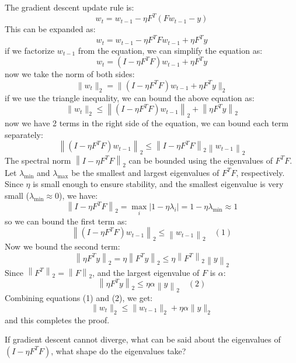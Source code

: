 \begin{qsolve}
	\begin{qsolve}[]
		The gradient descent update rule is:
		$$
		w_t = w_{t-1} - \eta F^T (F w_{t-1} - y)
		$$
		This can be expanded as:
		$$
		w_t = w_{t-1} - \eta F^T F w_{t-1} + \eta F^T y
		$$
		if we factorize \( w_{t-1} \) from the equation, we can simplify the equation as:
		$$
		w_t = (I - \eta F^T F) w_{t-1} + \eta F^T y
		$$
		now we take the norm of both sides:
		$$
		\| w_t \|_2 = \| (I - \eta F^T F) w_{t-1} + \eta F^T y \|_2
		$$
		if we use the triangle inequality, we can bound the above equation as:
		\splitqsolve[\splitqsolve]
		$$
		\| w_t \|_2 \leq \left\| (I - \eta F^T F) w_{t-1} \right\|_2 + \left\| \eta F^T y \right\|_2
		$$
		now we have 2 terms in the right side of the equation, we can bound each term separately:
		$$
		\left\| (I - \eta F^T F) w_{t-1} \right\|_2 \leq \left\| I - \eta F^T F \right\|_2 \left\| w_{t-1} \right\|_2
		$$
		The spectral norm \( \left\| I - \eta F^T F \right\|_2 \) can be bounded using the eigenvalues of \( F^T F \). Let \( \lambda_{\min} \) and \( \lambda_{\max} \) be the smallest and largest eigenvalues of \( F^T F \), respectively.
		Since \( \eta \) is small enough to ensure stability, and the smallest eigenvalue is very small (\( \lambda_{\min} \approx 0 \)), we have:
		$$
		\left\| I - \eta F^T F \right\|_2 = \max_{i} \left|1 - \eta \lambda_i\right| = 1 - \eta \lambda_{\min} \approx 1
		$$
		so we can bound the first term as:
		$$
		\left\| (I - \eta F^T F) w_{t-1} \right\|_2 \leq \left\| w_{t-1} \right\|_2 \quad (1)
		$$
		Now we bound the second term:
		$$
		\left\| \eta F^T y \right\|_2 = \eta \left\| F^T y \right\|_2 \leq \eta \left\| F^T \right\|_2 \left\| y \right\|_2
		$$
		Since \( \left\| F^T \right\|_2 = \left\| F \right\|_2 \), and the largest eigenvalue of \( F \) is \( \alpha \):
		$$
		\left\| \eta F^T y \right\|_2 \leq \eta \alpha \left\| y \right\|_2 \quad (2)
		$$
		Combining equations (1) and (2), we get:
		$$
		\| w_t \|_2 \leq \| w_{t-1} \|_2 + \eta \alpha \| y \|_2
		$$
		and this completes the proof.
	\end{qsolve}
\end{qsolve}
If gradient descent cannot diverge, what can be said about the eigenvalues of \( (I - \eta F^T F) \), what shape do the eigenvalues take?
